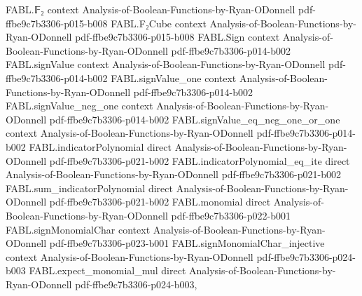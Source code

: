 \begin{theorem}
\label{FABL.ProbabilityDensity.IsBiased.violaTheorem}
\leanok
{}
\proofstep
  {FABL.𝔽₂}
  {context}
  {Analysis-of-Boolean-Functions-by-Ryan-ODonnell}
  {pdf-ffbe9c7b3306-p015-b008}
\proofstep
  {FABL.F₂Cube}
  {context}
  {Analysis-of-Boolean-Functions-by-Ryan-ODonnell}
  {pdf-ffbe9c7b3306-p015-b008}
\proofstep
  {FABL.Sign}
  {context}
  {Analysis-of-Boolean-Functions-by-Ryan-ODonnell}
  {pdf-ffbe9c7b3306-p014-b002}
\proofstep
  {FABL.signValue}
  {context}
  {Analysis-of-Boolean-Functions-by-Ryan-ODonnell}
  {pdf-ffbe9c7b3306-p014-b002}
\proofstep
  {FABL.signValue_one}
  {context}
  {Analysis-of-Boolean-Functions-by-Ryan-ODonnell}
  {pdf-ffbe9c7b3306-p014-b002}
\proofstep
  {FABL.signValue_neg_one}
  {context}
  {Analysis-of-Boolean-Functions-by-Ryan-ODonnell}
  {pdf-ffbe9c7b3306-p014-b002}
\proofstep
  {FABL.signValue_eq_neg_one_or_one}
  {context}
  {Analysis-of-Boolean-Functions-by-Ryan-ODonnell}
  {pdf-ffbe9c7b3306-p014-b002}
\proofstep
  {FABL.indicatorPolynomial}
  {direct}
  {Analysis-of-Boolean-Functions-by-Ryan-ODonnell}
  {pdf-ffbe9c7b3306-p021-b002}
\proofstep
  {FABL.indicatorPolynomial_eq_ite}
  {direct}
  {Analysis-of-Boolean-Functions-by-Ryan-ODonnell}
  {pdf-ffbe9c7b3306-p021-b002}
\proofstep
  {FABL.sum_indicatorPolynomial}
  {direct}
  {Analysis-of-Boolean-Functions-by-Ryan-ODonnell}
  {pdf-ffbe9c7b3306-p021-b002}
\proofstep
  {FABL.monomial}
  {direct}
  {Analysis-of-Boolean-Functions-by-Ryan-ODonnell}
  {pdf-ffbe9c7b3306-p022-b001}
\proofstep
  {FABL.signMonomialChar}
  {context}
  {Analysis-of-Boolean-Functions-by-Ryan-ODonnell}
  {pdf-ffbe9c7b3306-p023-b001}
\proofstep
  {FABL.signMonomialChar_injective}
  {context}
  {Analysis-of-Boolean-Functions-by-Ryan-ODonnell}
  {pdf-ffbe9c7b3306-p024-b003}
\proofstep
  {FABL.expect_monomial_mul}
  {direct}
  {Analysis-of-Boolean-Functions-by-Ryan-ODonnell}
  {pdf-ffbe9c7b3306-p024-b003,
}
\end{theorem}
